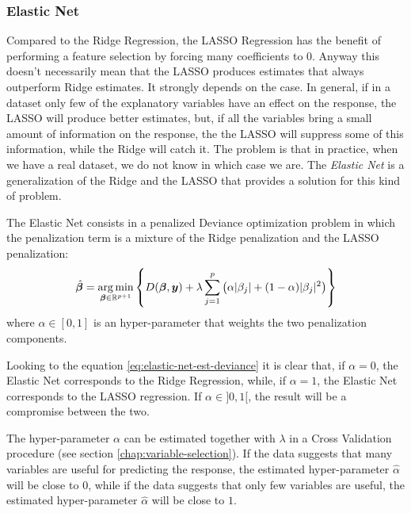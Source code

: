 \documentclass[a4paper, nobind]{templates/ociamthesis}
\theoremstyle{definition}
\theoremstyle{definition}
\theoremstyle{definition}
\theoremstyle{remark}
\begin{document}
\hypertarget{elastic-net}{%
\subsubsection{Elastic Net}\label{elastic-net}}

Compared to the Ridge Regression, the LASSO Regression has the benefit of performing a feature selection by forcing many coefficients to \(0\). Anyway this doesn't necessarily mean that the LASSO produces estimates that always outperform Ridge estimates. It strongly depends on the case. In general, if in a dataset only few of the explanatory variables have an effect on the response, the LASSO will produce better estimates, but, if all the variables bring a small amount of information on the response, the the LASSO will suppress some of this information, while the Ridge will catch it. The problem is that in practice, when we have a real dataset, we do not know in which case we are. The \emph{Elastic Net} is a generalization of the Ridge and the LASSO that provides a solution for this kind of problem.

The Elastic Net consists in a penalized Deviance optimization problem in which the penalization term is a mixture of the Ridge penalization and the LASSO penalization:
\begin{equation}
\label{eq:elastic-net-est-deviance}
\hat{\boldsymbol{\beta}} =  \operatorname*{arg\,min}_{\boldsymbol{\beta}\in\mathbb{R}^{p+1}}{\left\{
D(\boldsymbol{\beta}, \boldsymbol{y}) +
\lambda 
\sum_{j=1}^p{\left(\alpha |\beta_j| + (1 - \alpha) |\beta_j|^2\right)}
\right\}}
\end{equation}
where \(\alpha \in [0,1]\) is an hyper-parameter that weights the two penalization components.

Looking to the equation \eqref{eq:elastic-net-est-deviance} it is clear that, if \(\alpha=0\), the Elastic Net corresponds to the Ridge Regression, while, if \(\alpha=1\), the Elastic Net corresponds to the LASSO regression. If \(\alpha \in ]0,1[\), the result will be a compromise between the two.

The hyper-parameter \(\alpha\) can be estimated together with \(\lambda\) in a Cross Validation procedure (see section \ref{chap:variable-selection}). If the data suggests that many variables are useful for predicting the response, the estimated hyper-parameter \(\hat{\alpha}\) will be close to \(0\), while if the data suggests that only few variables are useful, the estimated hyper-parameter \(\hat{\alpha}\) will be close to \(1\).
\end{document}
